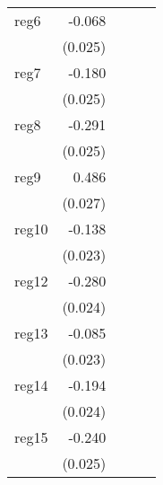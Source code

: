 {\begin{longtable}{l*{4}{D{.}{.}{-1}}}
\addlinespace
reg6        &      -0.068\sym{**} &                     &                     &                     \\
            &     (0.025)         &                     &                     &                     \\
\addlinespace
reg7        &      -0.180\sym{***}&                     &                     &                     \\
            &     (0.025)         &                     &                     &                     \\
\addlinespace
reg8        &      -0.291\sym{***}&                     &                     &                     \\
            &     (0.025)         &                     &                     &                     \\
\addlinespace
reg9        &       0.486\sym{***}&                     &                     &                     \\
            &     (0.027)         &                     &                     &                     \\
\addlinespace
reg10       &      -0.138\sym{***}&                     &                     &                     \\
            &     (0.023)         &                     &                     &                     \\
\addlinespace
reg12       &      -0.280\sym{***}&                     &                     &                     \\
            &     (0.024)         &                     &                     &                     \\
\addlinespace
reg13       &      -0.085\sym{***}&                     &                     &                     \\
            &     (0.023)         &                     &                     &                     \\
\addlinespace
reg14       &      -0.194\sym{***}&                     &                     &                     \\
            &     (0.024)         &                     &                     &                     \\
\addlinespace
reg15       &      -0.240\sym{***}&                     &                     &                     \\
            &     (0.025)         &                     &                     &                     \\

\end{longtable}}
